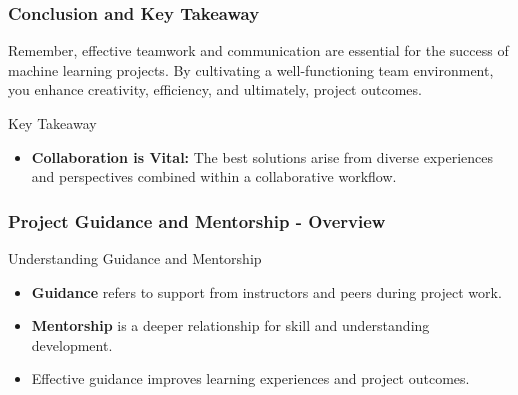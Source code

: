 \documentclass[aspectratio=169]{beamer}
\begin{document}
\begin{frame}[fragile]
    \frametitle{Conclusion and Key Takeaway}
    Remember, effective teamwork and communication are essential for the success of machine learning projects. 
    By cultivating a well-functioning team environment, you enhance creativity, efficiency, and ultimately, project outcomes.
    
    \begin{block}{Key Takeaway}
        \begin{itemize}
            \item \textbf{Collaboration is Vital:} The best solutions arise from diverse experiences and perspectives combined within a collaborative workflow.
        \end{itemize}
    \end{block}
\end{frame}

\begin{frame}[fragile]
    \frametitle{Project Guidance and Mentorship - Overview}
    \begin{block}{Understanding Guidance and Mentorship}
        \begin{itemize}
            \item \textbf{Guidance} refers to support from instructors and peers during project work.
            \item \textbf{Mentorship} is a deeper relationship for skill and understanding development.
            \item Effective guidance improves learning experiences and project outcomes.
        \end{itemize}
    \end{block}
\end{frame}
\end{document}
